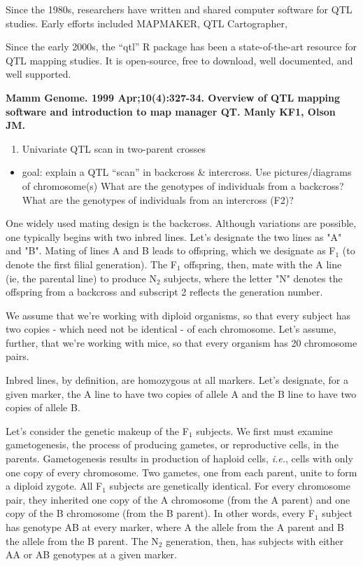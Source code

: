 \documentclass[]{article}
\providecommand{\tightlist}{%
  \setlength{\itemsep}{0pt}\setlength{\parskip}{0pt}}
\begin{document}
Since the 1980s, researchers have written and shared computer software
for QTL studies. Early efforts included MAPMAKER, QTL Cartographer,

Since the early 2000s, the ``qtl'' R package has been a
state-of-the-art resource for QTL mapping studies. It is open-source,
free to download, well documented, and well supported.

\textbf{Mamm Genome. 1999 Apr;10(4):327-34. Overview of QTL mapping
software and introduction to map manager QT. Manly KF1, Olson JM.}

\begin{enumerate}
\def\labelenumi{\arabic{enumi}.}
\setcounter{enumi}{1}
\tightlist
\item
  Univariate QTL scan in two-parent crosses
\end{enumerate}

\begin{itemize}
\tightlist
\item
  goal: explain a QTL ``scan'' in backcross \& intercross. Use
  pictures/diagrams of chromosome(s) What are the genotypes of
  individuals from a backcross? What are the genotypes of individuals
  from an intercross (F2)?
\end{itemize}

One widely used mating design is the backcross. Although variations are possible, one typically begins with two inbred lines. Let's designate the two lines as "A" and "B". Mating of lines A and B leads to offspring, which we designate as F$_1$ (to denote the first filial generation). The F$_1$ offspring, then, mate with the A line (ie, the parental line) to produce N$_2$ subjects, where the letter "N" denotes the offspring from a backcross and subscript 2 reflects the generation number.

We assume that we're working with diploid organisms, so that every subject has two copies - which need not be identical - of each chromosome. Let's assume, further, that we're working with mice, so that every organism has 20 chromosome pairs. 

Inbred lines, by definition, are homozygous at all markers. Let's designate, for a given marker, the A line to have two copies of allele A and the B line to have two copies of allele B. 

Let's consider the genetic makeup of the F$_1$ subjects. We first must examine gametogenesis, the process of producing gametes, or reproductive cells, in the parents. Gametogenesis results in production of haploid cells, \emph{i.e.}, cells with only one copy of every chromosome. Two gametes, one from each parent, unite to form a diploid zygote. All F$_1$ subjects are genetically identical. For every chromosome pair, they inherited one copy of the A chromosome (from the A parent) and one copy of the B chromosome (from the B parent). In other words, every F$_1$ subject has genotype AB at every marker, where A the allele from the A parent and B the allele from the B parent. The N$_2$ generation, then, has subjects with either AA or AB genotypes at a given marker. 
\end{document}
